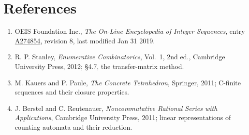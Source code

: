 \documentclass[11pt]{article}
\theoremstyle{definition}
\begin{document}
\section{References}

\begin{enumerate}

\item OEIS Foundation Inc., \emph{The On-Line Encyclopedia of Integer Sequences}, entry \href{https://oeis.org/A274854}{A274854}, revision 8, last modified Jan 31 2019.

\item R. P. Stanley, \emph{Enumerative Combinatorics}, Vol.~1, 2nd ed., Cambridge University Press, 2012; \S4.7, the transfer-matrix method.

\item M. Kauers and P. Paule, \emph{The Concrete Tetrahedron}, Springer, 2011; C-finite sequences and their closure properties.

\item J. Berstel and C. Reutenauer, \emph{Noncommutative Rational Series with Applications}, Cambridge University Press, 2011; linear representations of counting automata and their reduction.

\end{enumerate}
\end{document}

